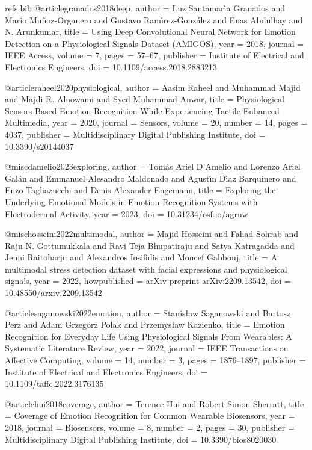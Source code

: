 \begin{filecontents*}[overwrite]{refs.bib}
@article{granados2018deep,
  author = {Luz Santamar{\'\i}a Granados and Mario Mu{\~n}oz-Organero and Gustavo Ram{\'\i}rez-Gonz{\'a}lez and Enas Abdulhay and N. Arunkumar},
  title = {{Using Deep Convolutional Neural Network for Emotion Detection on a Physiological Signals Dataset (AMIGOS)}},
  year = {2018},
  journal = {IEEE Access},
  volume = {7},
  pages = {57--67},
  publisher = {Institute of Electrical and Electronics Engineers},
  doi = {10.1109/access.2018.2883213}
}

@article{raheel2020physiological,
  author = {Aasim Raheel and Muhammad Majid and Majdi R. Alnowami and Syed Muhammad Anwar},
  title = {{Physiological Sensors Based Emotion Recognition While Experiencing Tactile Enhanced Multimedia}},
  year = {2020},
  journal = {Sensors},
  volume = {20},
  number = {14},
  pages = {4037},
  publisher = {Multidisciplinary Digital Publishing Institute},
  doi = {10.3390/s20144037}
}

@misc{damelio2023exploring,
  author = {Tom{\'a}s Ariel D'Amelio and Lorenzo Ariel Gal{\'a}n and Emmanuel Alesandro Maldonado and Agust{\'\i}n D{\'\i}az Barquinero and Enzo Tagliazucchi and Denis Alexander Engemann},
  title = {{Exploring the Underlying Emotional Models in Emotion Recognition Systems with Electrodermal Activity}},
  year = {2023},
  doi = {10.31234/osf.io/agruw}
}

@misc{hosseini2022multimodal,
  author = {Majid Hosseini and Fahad Sohrab and Raju N. Gottumukkala and Ravi Teja Bhupatiraju and Satya Katragadda and Jenni Raitoharju and Alexandros Iosifidis and Moncef Gabbouj},
  title = {{A multimodal stress detection dataset with facial expressions and physiological signals}},
  year = {2022},
  howpublished = {arXiv preprint arXiv:2209.13542},
  doi = {10.48550/arxiv.2209.13542}
}

@article{saganowski2022emotion,
  author = {Stanis{\l}aw Saganowski and Bartosz Perz and Adam  Grzegorz Polak and Przemys{\l}aw Kazienko},
  title = {{Emotion Recognition for Everyday Life Using Physiological Signals From Wearables: A Systematic Literature Review}},
  year = {2022},
  journal = {IEEE Transactions on Affective Computing},
  volume = {14},
  number = {3},
  pages = {1876--1897},
  publisher = {Institute of Electrical and Electronics Engineers},
  doi = {10.1109/taffc.2022.3176135}
}

@article{hui2018coverage,
  author = {Terence Hui and Robert Simon Sherratt},
  title = {{Coverage of Emotion Recognition for Common Wearable Biosensors}},
  year = {2018},
  journal = {Biosensors},
  volume = {8},
  number = {2},
  pages = {30},
  publisher = {Multidisciplinary Digital Publishing Institute},
  doi = {10.3390/bios8020030}
}


\end{filecontents*}
